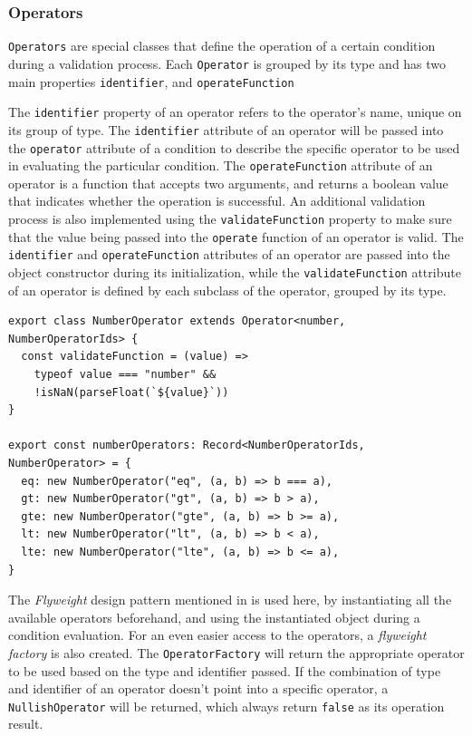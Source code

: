     \subsubsection{Operators}

      \verb;Operators; are special classes that define the operation of a certain condition during a validation process. Each \verb;Operator; is grouped by its type and has two main properties \verb;identifier;, and \verb;operateFunction;
      
      The \verb;identifier; property of an operator refers to the operator's name, unique on its group of type. The \verb;identifier; attribute of an operator will be passed into the \verb;operator; attribute of a condition to describe the specific operator to be used in evaluating the particular condition. The \verb;operateFunction; attribute of an operator is a function that accepts two arguments, and returns a boolean value that indicates whether the operation is successful. An additional validation process is also implemented using the \verb;validateFunction; property to make sure that the value being passed into the \verb;operate; function of an operator is valid. The \verb;identifier; and \verb;operateFunction; attributes of an operator are passed into the object constructor during its initialization, while the \verb;validateFunction; attribute of an operator is defined by each subclass of the operator, grouped by its type.  
      
      \begin{lstlisting}[style=es6, caption={NumberOperator example (TypeScript)}]
export class NumberOperator extends Operator<number, NumberOperatorIds> {
  const validateFunction = (value) =>
    typeof value === "number" &&
    !isNaN(parseFloat(`${value}`))
}

export const numberOperators: Record<NumberOperatorIds, NumberOperator> = {
  eq: new NumberOperator("eq", (a, b) => b === a),
  gt: new NumberOperator("gt", (a, b) => b > a),
  gte: new NumberOperator("gte", (a, b) => b >= a),
  lt: new NumberOperator("lt", (a, b) => b < a),
  lte: new NumberOperator("lte", (a, b) => b <= a),
} 
      \end{lstlisting}

      The \emph{Flyweight} design pattern mentioned in \autocite[pp. 195-206]{gamma-1995} is used here, by instantiating all the available operators beforehand, and using the instantiated object during a condition evaluation. For an even easier access to the operators, a \emph{flyweight factory} is also created. The \verb;OperatorFactory; will return the appropriate operator to be used based on the type and identifier passed. If the combination of type and identifier of an operator doesn't point into a specific operator, a \verb;NullishOperator; will be returned, which always return \verb;false; as its operation result. 

